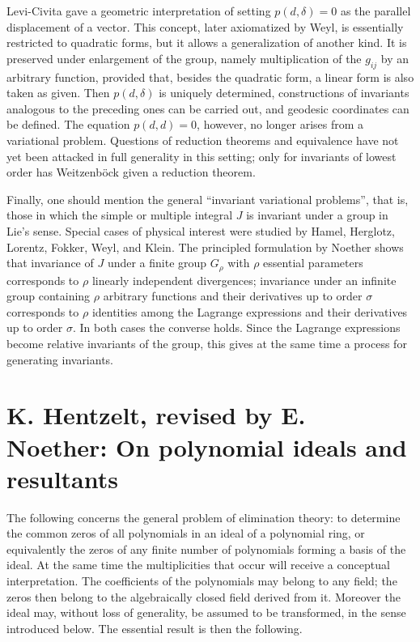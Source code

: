 \documentclass[11pt]{article}
\begin{document}
Levi-Civita gave a geometric interpretation of setting $p(d,\delta)=0$ as the parallel displacement of a vector. This concept, later axiomatized by Weyl, is essentially restricted to quadratic forms, but it allows a generalization of another kind. It is preserved under enlargement of the group, namely multiplication of the $g_{ij}$ by an arbitrary function, provided that, besides the quadratic form, a linear form is also taken as given. Then $p(d,\delta)$ is uniquely determined, constructions of invariants analogous to the preceding ones can be carried out, and geodesic coordinates can be defined. The equation $p(d,d)=0$, however, no longer arises from a variational problem. Questions of reduction theorems and equivalence have not yet been attacked in full generality in this setting; only for invariants of lowest order has Weitzenböck given a reduction theorem.

Finally, one should mention the general ``invariant variational problems'', that is, those in which the simple or multiple integral $J$ is invariant under a group in Lie's sense. Special cases of physical interest were studied by Hamel, Herglotz, Lorentz, Fokker, Weyl, and Klein. The principled formulation by Noether shows that invariance of $J$ under a finite group $G_\rho$ with $\rho$ essential parameters corresponds to $\rho$ linearly independent divergences; invariance under an infinite group containing $\rho$ arbitrary functions and their derivatives up to order $\sigma$ corresponds to $\rho$ identities among the Lagrange expressions and their derivatives up to order $\sigma$. In both cases the converse holds. Since the Lagrange expressions become relative invariants of the group, this gives at the same time a process for generating invariants.

\newpage

\section{K. Hentzelt, revised by E. Noether: On polynomial ideals and resultants}

The following concerns the general problem of elimination theory: to determine the common zeros of all polynomials in an ideal of a polynomial ring, or equivalently the zeros of any finite number of polynomials forming a basis of the ideal. At the same time the multiplicities that occur will receive a conceptual interpretation. The coefficients of the polynomials may belong to any field; the zeros then belong to the algebraically closed field derived from it. Moreover the ideal may, without loss of generality, be assumed to be transformed, in the sense introduced below. The essential result is then the following.
\end{document}
